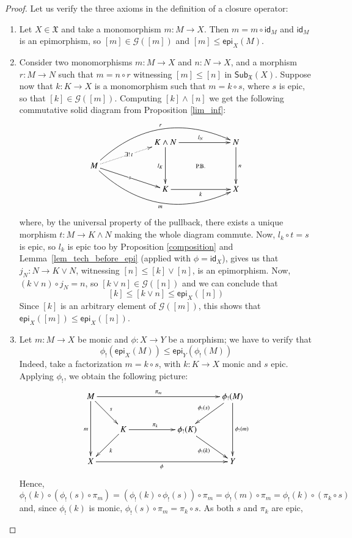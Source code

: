 \documentclass[12pt]{article}
\theoremstyle{definition}
\def\X{\mathfrak X}
\numberwithin{equation}{section}
\newcommand{\catname}[1]{\mathbf{#1}}
\newcommand{\sub}[1]{\mathsf{Sub}_{\catname{#1}}}
\newcommand{\id}[1]{\mathsf{id}_{#1}}
\def\epi{\mathsf{epi}}
\begin{document}
\begin{proof}
	Let us verify the three axioms in the definition of a closure operator:
	\begin{enumerate}[\rm {(CO.}1)]
		\item	Let $X\in \X$ and take a monomorphism $m\colon M\rightarrow X$. Then $m=m\circ \id{M}$ and $\id M$ is an epimorphism, so $[m]\in \mathcal{G}([m])$ and $[m]\leq \epi_{X}(M)$. 
		\item Consider two monomorphisms $m\colon M\to X$ and $n\colon N\to X$, and a morphism $r\colon M\to N$ such that $m=n\circ r$ witnessing $[m]\leq [n]$ in $\sub\X(X)$. Suppose now that $k\colon K\rightarrow X$ is a monomorphism such that $m=k\circ s$, where $s$ is epic, so that $[k]\in \mathcal{G}([m])$. Computing $[k]\wedge [n]$ we get the following commutative solid diagram from Proposition \ref{lim_inf}:
		\[
		\xymatrix@C=60pt@R=15pt{
			&K\wedge N\ar@{}[ddr]|{\text{P.B.}}\ar[dd]_{l_K}\ar[r]^{l_N}&N\ar[dd]^n\\
			M\ar[rd]|s\ar@{.>}[ru]|{\exists!\, t\ }\ar@/_30pt/[rrd]_m\ar@/_-30pt/[rru]^r\\
			&K\ar[r]_{k}&X
		}
		\]
		where, by the universal property of the pullback, there exists a unique morphism $t\colon M\to K\wedge N$ making the whole diagram commute. Now, $l_k\circ t=s$ is epic, so $l_k$ is epic too by Proposition \ref{composition} and Lemma~\ref{lem_tech_before_epi} (applied with $\phi=\id X$), gives us that $j_N\colon N\to K\vee N$, witnessing $[n]\leq [k]\vee [n]$, is an epimorphism. Now, $(k\vee n)\circ j_N=n$, so $[k\vee n]\in \mathcal{G}([n])$ and we can conclude that
		\[[k]\leq [k\vee n] \leq \epi_{X}([n])\]
		Since $[k]$ is an arbitrary element of $\mathcal{G}([m])$, this shows that $\epi_X([m])\leq \epi_X([n])$. 
		\item Let $m\colon M\to X$ be monic and $\phi\colon X\rightarrow Y$ be a morphism; we have to verify that
		\[\phi_!(\epi_{X}(M))\leq\epi_{Y}({\phi_!(M)})\]
		 Indeed, take a factorization $m=k\circ s$, with $k\colon K\to X$ monic and $s$ epic. Applying $\phi_!$, we obtain the following picture:
		\[
		\xymatrix{
			M\ar[rrrr]^-{\pi_{m}}\ar[dr]^s\ar[dd]_m&&&& \phi_!(M)\ar[dd]^{\phi_!(m)}\ar[dl]_{\phi_!(s)}\\
			&K\ar[dl]^k\ar[rr]^{\pi_{k}}&&\phi_!(K)\ar[dr]_{\phi_!(k)}\\
			X\ar[rrrr]_-\phi&&&&Y
		}
		\]
		Hence,
		\[
		\phi_!(k)\circ (\phi_!(s)\circ \pi_{m})=(\phi_!(k)\circ \phi_!(s))\circ \pi_{m}=\phi_!(m)\circ \pi_{m}=\phi_!(k)\circ (\pi_{k}\circ s)
		\]
		and, since $\phi_!(k)$ is monic, $\phi_!(s)\circ \pi_{m}=\pi_{k}\circ s$. As both $s$ and $\pi_{k}$ are epic,

\end{enumerate}
\end{proof}
\end{document}
